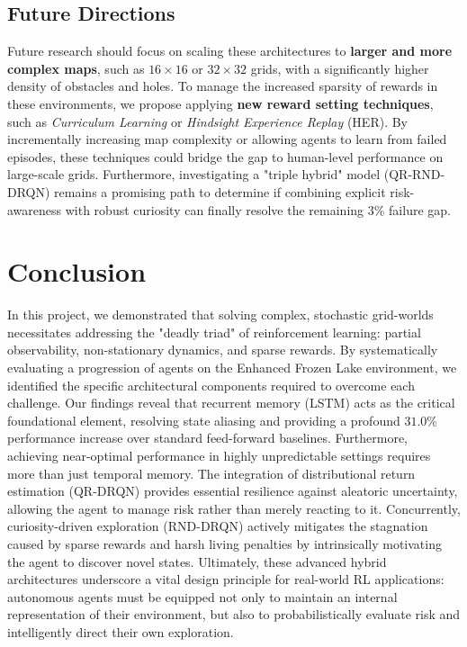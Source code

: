 \documentclass{article}
\begin{document}
\subsection{Future Directions}
Future research should focus on scaling these architectures to \textbf{larger and more complex maps}, such as $16\times16$ or $32\times32$ grids, with a significantly higher density of obstacles and holes. To manage the increased sparsity of rewards in these environments, we propose applying \textbf{new reward setting techniques}, such as \textit{Curriculum Learning} or \textit{Hindsight Experience Replay} (HER). By incrementally increasing map complexity or allowing agents to learn from failed episodes, these techniques could bridge the gap to human-level performance on large-scale grids. Furthermore, investigating a "triple hybrid" model (QR-RND-DRQN) remains a promising path to determine if combining explicit risk-awareness with robust curiosity can finally resolve the remaining $3\%$ failure gap.

\section{Conclusion}
In this project, we demonstrated that solving complex, stochastic grid-worlds necessitates addressing the "deadly triad" of reinforcement learning: partial observability, non-stationary dynamics, and sparse rewards. By systematically evaluating a progression of agents on the Enhanced Frozen Lake environment, we identified the specific architectural components required to overcome each challenge. Our findings reveal that recurrent memory (LSTM) acts as the critical foundational element, resolving state aliasing and providing a profound $31.0\%$ performance increase over standard feed-forward baselines. Furthermore, achieving near-optimal performance in highly unpredictable settings requires more than just temporal memory. The integration of distributional return estimation (QR-DRQN) provides essential resilience against aleatoric uncertainty, allowing the agent to manage risk rather than merely reacting to it. Concurrently, curiosity-driven exploration (RND-DRQN) actively mitigates the stagnation caused by sparse rewards and harsh living penalties by intrinsically motivating the agent to discover novel states. Ultimately, these advanced hybrid architectures underscore a vital design principle for real-world RL applications: autonomous agents must be equipped not only to maintain an internal representation of their environment, but also to probabilistically evaluate risk and intelligently direct their own exploration.
\end{document}
